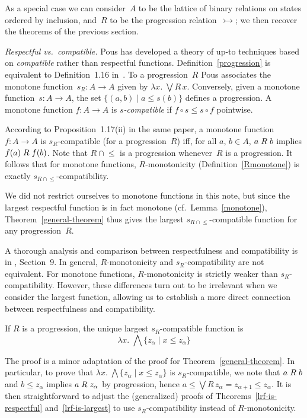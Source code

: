 \documentclass{CSML}
\theoremstyle{definition}
\newcommand{\progress}{\rightarrowtail}
\begin{document}
As a special case we can consider~$A$ to be the lattice of binary
relations on states ordered by inclusion, and~$R$ to be the
progression relation~$\progress$; we then recover the theorems of the
previous section.

\medskip

\noindent \emph{Respectful vs.\ compatible.}
Pous has developed a theory of up-to techniques based on
\emph{compatible} rather than respectful functions.
Definition~\ref{progression} is equivalent to Definition~1.16
in~\cite{Pous2007}.  To a progression~$R$ Pous associates the monotone
function~$s_R\colon A\to A$ given by $\lambda x.\; \bigvee R\,x$.
Conversely, given a monotone function~$s\colon A\to A$, the set
$\{(a,b) \mid a \leq s(b)\}$ defines a progression.  A monotone
function $f\colon A\to A$ is \emph{$s$-compatible} if $f \circ s \leq
s \circ f$ pointwise.

According to Proposition~1.17(ii) in the same paper, a monotone
function~$f\colon A\to A$ is $s_R$-compatible (for a progression~$R$)
iff, for all $a$, $b\in A$, $a \mathrel{R} b$ implies $f(a) \mathrel{R} f(b)$.  Note
that $R \cap \mathop{\leq}$ is a progression whenever~$R$ is a
progression.  It follows that for monotone functions, $R$-monotonicity
(Definition~\ref{Rmonotone}) is exactly $s_{R \cap
  \mathop{\leq}}$-compatibility.

We did not restrict ourselves to monotone functions in this note, but
since the largest respectful function is in fact monotone
(cf.\ Lemma~\ref{monotone}), Theorem~\ref{general-theorem} thus gives
the largest $s_{R \cap \mathop{\leq}}$-compatible function for any
progression~$R$.

A thorough analysis and comparison between respectfulness and
compatibility is in \cite{Pous2016}, Section~9.  In general,
$R$-monotonicity and $s_R$-compatibility are not equivalent.  For
monotone functions, $R$-monotonicity is strictly weaker than
$s_R$-compatibility.  However, these differences turn out to be
irrelevant when we consider the largest function, allowing us to
establish a more direct connection between respectfulness and
compatibility.

\begin{thm}
\label{theorem-companion}
If $R$ is a progression, the unique largest $s_R$-compatible function
is
\[\lambda x.\; \bigwedge \{z_\alpha \mid x \leq z_\alpha\}\]
\end{thm}\smallskip

\noindent The proof is a minor adaptation of the proof for
Theorem~\ref{general-theorem}.  In particular, to prove that $\lambda
x.\; \bigwedge \{z_\alpha \mid x \leq z_\alpha\}$ is $s_R$-compatible,
we note that $a \mathrel{R} b$ and $b \leq z_\alpha$ implies $a \mathrel{R} z_\alpha$ by
progression, hence $a \leq \bigvee R\,z_\alpha = z_{\alpha+1} \leq
z_\alpha$.  It is then straightforward to adjust the (generalized)
proofs of Theorems~\ref{lrf-is-respectful} and~\ref{lrf-is-largest} to
use $s_R$-compatibility instead of $R$-monotonicity.
\end{document}
